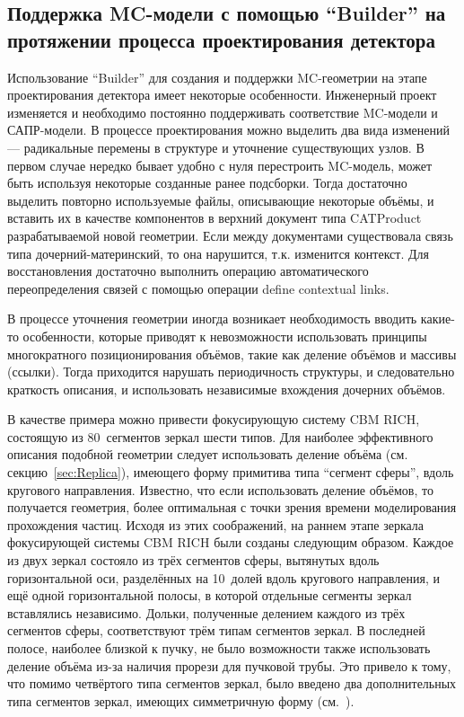 \subsection{Поддержка MC-модели с помощью ``Builder'' на протяжении процесса проектирования детектора}\label{sec:DesignProcess}

Использование ``Builder'' для создания и поддержки MC-геометрии на этапе проектирования детектора имеет некоторые особенности. Инженерный проект изменяется и необходимо постоянно поддерживать соответствие MC-модели и САПР-модели. В процессе проектирования можно выделить два вида изменений --- радикальные перемены в структуре и уточнение существующих узлов. В первом случае нередко бывает удобно с нуля перестроить MC-модель, может быть используя некоторые созданные ранее подсборки. Тогда достаточно выделить повторно используемые файлы, описывающие некоторые объёмы, и вставить их в качестве компонентов в верхний документ типа CATProduct разрабатываемой новой геометрии. Если между документами существовала связь типа дочерний-материнский, то она нарушится, т.к. изменится контекст. Для восстановления достаточно выполнить операцию автоматического переопределения связей с помощью операции define contextual links.

В процессе уточнения геометрии иногда возникает необходимость вводить какие-то особенности, которые приводят к невозможности использовать принципы многократного позиционирования объёмов, такие как деление объёмов и массивы (\todo ссылки). Тогда приходится нарушать периодичность структуры, и следовательно краткость описания, и использовать независимые вхождения дочерних объёмов. 

В качестве примера можно привести фокусирующую систему CBM RICH, состоящую из 80~сегментов зеркал шести типов. Для наиболее эффективного описания подобной геометрии следует использовать деление объёма (см. секцию~\ref{sec:Replica}), имеющего форму примитива типа ``сегмент сферы'', вдоль кругового направления. Известно, что если использовать деление объёмов, то получается геометрия, более оптимальная с точки зрения времени моделирования прохождения частиц. Исходя из этих соображений, на раннем этапе зеркала фокусирующей системы CBM RICH были созданы следующим образом. Каждое из двух зеркал состояло из трёх сегментов сферы, вытянутых вдоль горизонтальной оси, разделённых на 10~долей вдоль кругового направления, и ещё одной горизонтальной полосы, в которой отдельные сегменты зеркал вставлялись независимо. Дольки, полученные делением каждого из трёх сегментов сферы, соответствуют трём типам сегментов зеркал. В последней полосе, наиболее близкой к пучку, не было возможности также использовать деление объёма из-за наличия прорези для пучковой трубы. Это привело к тому, что помимо четвёртого типа сегментов зеркал, было введено два дополнительных типа сегментов зеркал, имеющих симметричную форму (см.~\figref{}).

